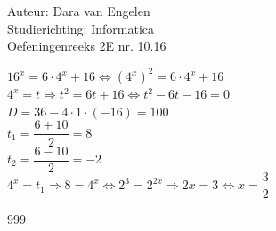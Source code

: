 \documentclass[a4paper]{article}
\begin{document}
  
\noindent \large Auteur: Dara van Engelen\\
\noindent \large Studierichting: Informatica\\
\noindent \large Oefeningenreeks 2E nr. 10.16\\

\medskip

\normalsize

$16^x = 6 \cdot 4^x + 16 \Leftrightarrow \left(4^x\right)^2 = 6 \cdot 4^x + 16$\\

$4^x = t \Rightarrow t^2 = 6t + 16 \Leftrightarrow t^2 -6t -16 = 0$\\

$ D = 36 - 4 \cdot 1 \cdot (-16) = 100$\\

$t_1 = \dfrac{6+10}{2} = 8$\\

$t_2 = \dfrac{6-10}{2} = -2$\\

$4^x = t_1 \Rightarrow 8 = 4^x \Leftrightarrow 2^3 = 2^{2x} \Rightarrow 2x = 3 \Leftrightarrow x = \dfrac{3}{2}$





\begin{thebibliography}{999}
\end{thebibliography}
\end{document}
